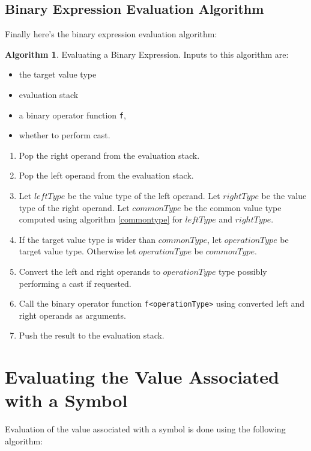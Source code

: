 \documentclass[a4paper,oneside,11pt]{book}
\theoremstyle{definition}
\newtheorem{algo}{Algorithm}[section]
\begin{document}
\subsection{Binary Expression Evaluation Algorithm}

Finally here's the binary expression evaluation algorithm:

\begin{algo}\label{binaryexpreval} Evaluating a Binary Expression.
Inputs to this algorithm are:
\begin{itemize}
\item
the target value type
\item
evaluation stack
\item
a binary operator function \verb|f|,
\item
whether to perform cast.
\end{itemize}

\begin{enumerate}
\item
Pop the right operand from the evaluation stack.
\item
Pop the left operand from the evaluation stack.
\item
Let $leftType$ be the value type of the left operand.
Let $rightType$ be the value type of the right operand.
Let $commonType$ be the common value type computed using algorithm \ref{commontype} for $leftType$ and $rightType$.
\item
If the target value type is wider than $commonType$, let $operationType$ be target value type.
Otherwise let $operationType$ be $commonType$.
\item
Convert the left and right operands to $operationType$ type possibly performing a cast if requested.
\item
Call the binary operator function \verb|f<operationType>| using converted left and right operands as arguments.
\item
Push the result to the evaluation stack.
\end{enumerate}
\end{algo}

\section{Evaluating the Value Associated with a Symbol}

Evaluation of the value associated with a symbol is done using the following algorithm:
\end{document}
